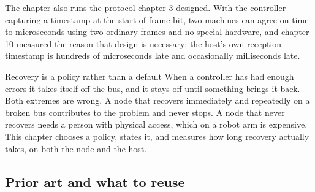 The chapter also runs the protocol chapter 3 designed. With the controller
capturing a timestamp at the start-of-frame bit, two machines can agree on time
to microseconds using two ordinary frames and no special hardware, and chapter
10 measured the reason that design is necessary: the host's own reception
timestamp is hundreds of microseconds late and occasionally milliseconds late.

\begin{note}{Recovery is a policy rather than a default}
When a controller has had enough errors it takes itself off the bus, and it
stays off until something brings it back. Both extremes are wrong. A node that
recovers immediately and repeatedly on a broken bus contributes to the problem
and never stops. A node that never recovers needs a person with physical access,
which on a robot arm is expensive. This chapter chooses a policy, states it, and
measures how long recovery actually takes, on both the node and the host.
\end{note}

\subsection*{Prior art and what to reuse}

